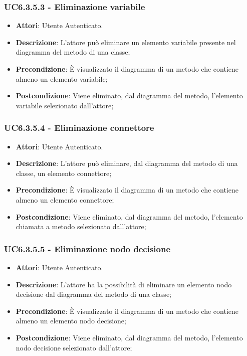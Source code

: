 \subsubsection{UC6.3.5.3 - Eliminazione variabile} 
\label{sssec:UC6.3.5.3} 
\begin{itemize} 
\item \textbf{Attori}: Utente Autenticato.
\item \textbf{Descrizione}: L'attore può eliminare un elemento variabile presente nel diagramma del metodo di una classe;
\item \textbf{Precondizione}: È visualizzato il diagramma di un metodo che contiene almeno un elemento variabile;
\item \textbf{Postcondizione}: Viene eliminato, dal diagramma del metodo,  l'elemento variabile selezionato dall'attore;
\end{itemize} 
\subsubsection{UC6.3.5.4 - Eliminazione connettore} 
\label{sssec:UC6.3.5.4} 
\begin{itemize} 
\item \textbf{Attori}: Utente Autenticato.
\item \textbf{Descrizione}: L'attore può eliminare, dal diagramma del metodo di una classe, un elemento connettore;
\item \textbf{Precondizione}: È visualizzato il diagramma di un metodo che contiene almeno un elemento connettore;
\item \textbf{Postcondizione}: Viene eliminato, dal diagramma del metodo,  l'elemento chiamata a metodo selezionato dall'attore;
\end{itemize} 
\subsubsection{UC6.3.5.5 - Eliminazione nodo decisione} 
\label{sssec:UC6.3.5.5} 
\begin{itemize} 
\item \textbf{Attori}: Utente Autenticato.
\item \textbf{Descrizione}: L'attore ha la possibilità di eliminare un elemento nodo decisione dal diagramma del metodo di una classe;
\item \textbf{Precondizione}: È visualizzato il diagramma di un metodo che contiene almeno un elemento nodo decisione;
\item \textbf{Postcondizione}: Viene eliminato, dal diagramma del metodo,  l'elemento nodo decisione selezionato dall'attore;
\end{itemize} 
